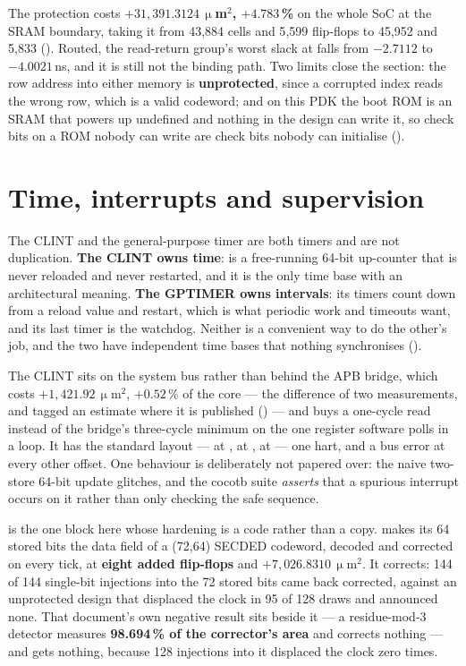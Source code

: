 The protection costs \textbf{$+31{,}391.3124\,\upmu$m$^2$, $+4.783$\,\%}
on the whole SoC at the SRAM boundary, taking it from 43{,}884 cells and
5{,}599 flip-flops to 45{,}952 and 5{,}833 ().
Routed, the read-return group's worst slack at
 falls from $-2.7112$ to
$-4.0021$\,ns, and it is still not the binding path. Two limits close the
section: the row address into
either memory is \textbf{unprotected}, since a corrupted index reads the
wrong row, which is a valid codeword; and on this PDK the boot ROM is an
SRAM that powers up undefined and nothing in the design can write it, so
check bits on a ROM nobody can write are check bits nobody can initialise
().

\section{Time, interrupts and supervision}

The CLINT and the general-purpose timer are both timers and are not
duplication. \textbf{The CLINT owns time}:  is a free-running
64-bit up-counter that is never reloaded and never restarted, and it is
the only time base with an architectural meaning. \textbf{The GPTIMER
owns intervals}: its timers count down from a reload value and restart,
which is what periodic work and timeouts want, and its last timer is the
watchdog. Neither is a convenient way to do the other's job, and the two
have independent time bases that nothing synchronises
().

The CLINT sits on the system bus rather than behind the APB bridge, which
costs $+1{,}421.92\,\upmu$m$^2$, $+0.52$\,\% of the core --- the difference
of two measurements, and tagged an estimate where it is published
() --- and buys a
one-cycle  read instead of the bridge's three-cycle minimum
on the one register software polls in a loop. It has the standard layout
---  at ,  at ,
 at  --- one hart, and a bus error at every other
offset. One behaviour is deliberately not papered over: the naive two-store
64-bit  update glitches, and the cocotb suite
\emph{asserts} that a spurious interrupt occurs on it rather than only
checking the safe sequence.

 is the one block here whose hardening is a code rather than
a copy.  makes its 64 stored bits the data field of a (72,64)
SECDED codeword, decoded and corrected on every tick, at \textbf{eight
added flip-flops} and $+7{,}026.8310\,\upmu$m$^2$. It corrects: 144 of 144 single-bit injections into the 72 stored bits came
back corrected, against an unprotected design that
displaced the clock in 95 of 128 draws and announced none. That
document's own negative result sits beside it --- a residue-mod-3
detector measures \textbf{98.694\,\% of the corrector's area} and
corrects nothing --- and  gets nothing, because 128
injections into it displaced the clock zero times.

